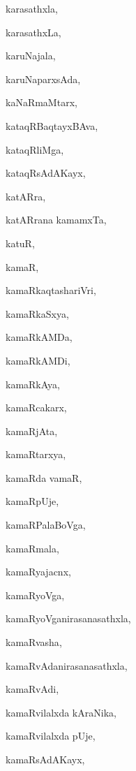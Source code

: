 \begin{multicols}{2}
{karasathxla}, \pageref{karasathxla}

{karasathxLa}, \pageref{karasathxLa}

{karuNajala}, \pageref{karuNajala}

{karuNaparxsAda}, \pageref{karuNaparxsAda}

{kaNaRmaMtarx}, \pageref{kaNaRmaMtarx}

{kataqRBaqtayxBAva}, \pageref{kataqRBaqtayxBAva}

{kataqRliMga}, \pageref{kataqRliMga}

{kataqRsAdAKayx}, \pageref{kataqRsAdAKayx}

{katARra}, \pageref{katARra}

{katARrana kamamxTa}, \pageref{katARrana kamamxTa}

{katuR}, \pageref{katuR}

{kamaR}, \pageref{kamaR}

{kamaRkaqtashariVri}, \pageref{kamaRkaqtashariVri}

{kamaRkaSxya}, \pageref{kamaRkaSxya}

{kamaRkAMDa}, \pageref{kamaRkAMDa}

{kamaRkAMDi}, \pageref{kamaRkAMDi}

{kamaRkAya}, \pageref{kamaRkAya}

{kamaRcakarx}, \pageref{kamaRcakarx}

{kamaRjAta}, \pageref{kamaRjAta}

{kamaRtarxya}, \pageref{kamaRtarxya}

{kamaRda vamaR}, \pageref{kamaRda vamaR}

{kamaRpUje}, \pageref{kamaRpUje}

{kamaRPalaBoVga}, \pageref{kamaRPalaBoVga}

{kamaRmala}, \pageref{kamaRmala}

{kamaRyajacnx}, \pageref{kamaRyajacnx}

{kamaRyoVga}, \pageref{kamaRyoVga}

{kamaRyoVganirasanasathxla}, \pageref{kamaRyoVganirasanasathxla}

{kamaRvasha}, \pageref{kamaRvasha}

{kamaRvAdanirasanasathxla}, \pageref{kamaRvAdanirasanasathxla}

{kamaRvAdi}, \pageref{kamaRvAdi}

{kamaRvilalxda kAraNika}, \pageref{kamaRvilalxda kAraNika}

{kamaRvilalxda pUje}, \pageref{kamaRvilalxda pUje}

{kamaRsAdAKayx}, \pageref{kamaRsAdAKayx}


\end{multicols}
